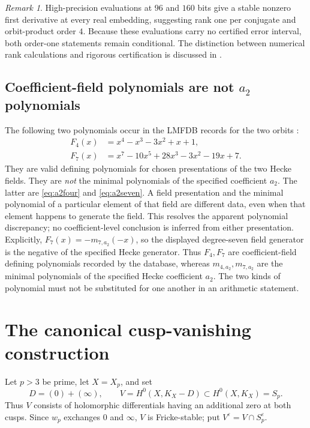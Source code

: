 \documentclass[11pt]{article}
\theoremstyle{definition}
\theoremstyle{remark}
\newtheorem{remark}[theorem]{Remark}
\begin{document}
\begin{remark}
High-precision evaluations at $96$ and $160$ bits give a stable nonzero first
derivative at every real embedding, suggesting rank one per conjugate and
orbit-product order $4$.  Because these evaluations carry no certified error
interval, both order-one statements remain conditional.  The distinction
between numerical rank calculations and rigorous certification is discussed in
\cite[Section~9.4, pp.~36--38]{BestEtAl2021}.
\end{remark}

\subsection{Coefficient-field polynomials are not \texorpdfstring{$a_2$}{a2} polynomials}

The following two polynomials occur in the LMFDB records for the two
orbits \cite{LMFDB137a,LMFDB137b}:
\begin{align}
  F_4(x)&=x^4-x^3-3x^2+x+1,\label{eq:fieldfour}\\
  F_7(x)&=x^7-10x^5+28x^3-3x^2-19x+7.\label{eq:fieldseven}
\end{align}
They are valid defining polynomials for chosen presentations of the two Hecke
fields.  They are \emph{not} the minimal polynomials of the specified
coefficient $a_2$.  The latter are \eqref{eq:a2four} and
\eqref{eq:a2seven}.  A field presentation and the minimal polynomial of a
particular element of that field are different data, even when that element
happens to generate the field.  This resolves the apparent polynomial
discrepancy; no coefficient-level conclusion is inferred from either
presentation.  Explicitly, $F_7(x)=-m_{7,a_2}(-x)$, so the displayed
degree-seven field generator is the negative of the specified Hecke generator.
Thus $F_4,F_7$ are coefficient-field defining polynomials recorded by the
database, whereas $m_{4,a_2},m_{7,a_2}$ are the minimal polynomials of the
specified Hecke coefficient $a_2$.  The two kinds of polynomial must not be
substituted for one another in an arithmetic statement.

\section{The canonical cusp-vanishing construction}

Let $p>3$ be prime, let $X=X_p$, and set
\[
  D=(0)+(\infty), \qquad V=H^0(X,K_X-D)\subset H^0(X,K_X)=S_p.
\]
Thus $V$ consists of holomorphic differentials having an additional zero at
both cusps.  Since $w_p$ exchanges $0$ and $\infty$, $V$ is Fricke-stable; put
$V^\varepsilon=V\cap S_p^\varepsilon$.
\end{document}
